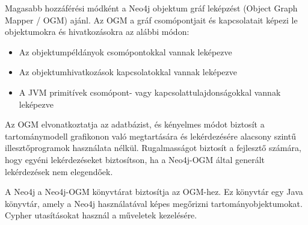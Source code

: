 Magasabb hozzáférési módként a Neo4j objektum gráf leképzést (Object Graph Mapper / OGM) ajánl.  Az OGM a gráf csomópontjait és kapcsolatait képezi le objektumokra és hivatkozásokra az alábbi módon:
\begin{itemize}
    \item Az objektumpéldányok csomópontokkal vannak leképezve
    \item  Az objektumhivatkozások kapcsolatokkal vannak leképezve
    \item A JVM primitívek csomópont- vagy kapcsolattulajdonságokkal vannak leképezve
\end{itemize}

Az OGM elvonatkoztatja az adatbázist, és kényelmes módot biztosít a tartománymodell grafikonon való megtartására és lekérdezésére alacsony szintű illesztőprogramok használata nélkül. Rugalmasságot biztosít a fejlesztő számára, hogy egyéni lekérdezéseket biztosítson, ha a Neo4j-OGM által generált lekérdezések nem elegendőek.

\bigskip

A Neo4j a Neo4j-OGM könyvtárat biztosítja az OGM-hez. Ez könyvtár egy Java könyvtár, amely a Neo4j használatával képes megőrizni tartományobjektumokat. Cypher utasításokat használ a műveletek kezelésére.

